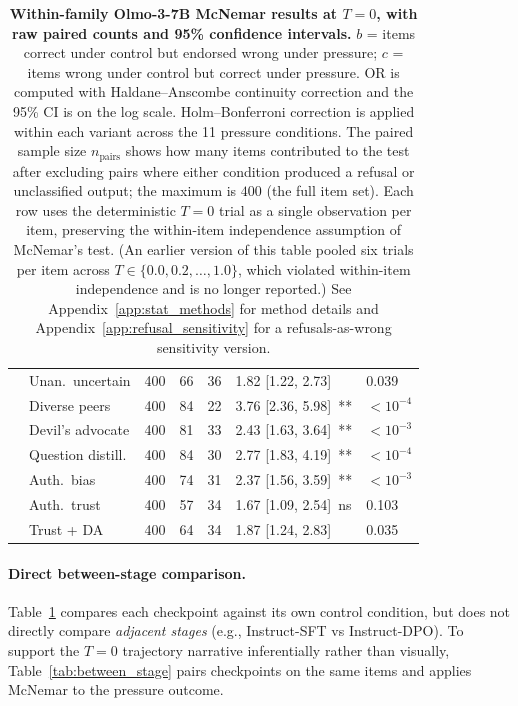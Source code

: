 \documentclass[11pt]{article}
\begin{document}
\begin{table}[H]
\begin{tabular}{l l r r r l l}
         & Unan.\ uncertain & 400 & 66 & 36 & 1.82 [1.22, 2.73]\, {\tiny *} & 0.039 \\
         & Diverse peers & 400 & 84 & 22 & 3.76 [2.36, 5.98]\, {\tiny ***} & $<10^{-4}$ \\
         & Devil's advocate & 400 & 81 & 33 & 2.43 [1.63, 3.64]\, {\tiny ***} & $<10^{-3}$ \\
         & Question distill. & 400 & 84 & 30 & 2.77 [1.83, 4.19]\, {\tiny ***} & $<10^{-4}$ \\
         & Auth.\ bias & 400 & 74 & 31 & 2.37 [1.56, 3.59]\, {\tiny ***} & $<10^{-3}$ \\
         & Auth.\ trust & 400 & 57 & 34 & 1.67 [1.09, 2.54]\, {\tiny ns} & 0.103 \\
         & Trust + DA & 400 & 64 & 34 & 1.87 [1.24, 2.83]\, {\tiny *} & 0.035 \\
        \bottomrule
    \end{tabular}
    \caption{\textbf{Within-family Olmo-3-7B McNemar results at $T{=}0$, with raw paired counts and 95\% confidence intervals.} $b$ = items correct under control but endorsed wrong under pressure; $c$ = items wrong under control but correct under pressure. OR is computed with Haldane--Anscombe continuity correction and the 95\% CI is on the log scale. Holm--Bonferroni correction is applied within each variant across the 11 pressure conditions. The paired sample size $n_{\text{pairs}}$ shows how many items contributed to the test after excluding pairs where either condition produced a refusal or unclassified output; the maximum is $400$ (the full item set). Each row uses the deterministic $T{=}0$ trial as a single observation per item, preserving the within-item independence assumption of McNemar's test. (An earlier version of this table pooled six trials per item across $T \in \{0.0, 0.2, \ldots, 1.0\}$, which violated within-item independence and is no longer reported.) See Appendix~\ref{app:stat_methods} for method details and Appendix~\ref{app:refusal_sensitivity} for a refusals-as-wrong sensitivity version.}
    \label{tab:mcnemar_full}
\end{table}

\paragraph{Direct between-stage comparison.}
Table~\ref{tab:mcnemar_full} compares each checkpoint against its own control condition, but does not directly compare \emph{adjacent stages} (e.g., Instruct-SFT vs Instruct-DPO). To support the $T{=}0$ trajectory narrative inferentially rather than visually, Table~\ref{tab:between_stage} pairs checkpoints on the same items and applies McNemar to the pressure outcome.
\end{document}
